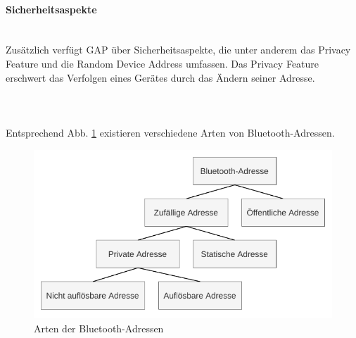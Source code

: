 \paragraph{Sicherheitsaspekte} \mbox{} \vspace{0.2cm} \\
\label{sec: gap sicherheit}
Zusätzlich verfügt GAP über Sicherheitsaspekte, die unter anderem das Privacy Feature und die Random Device Address umfassen. Das Privacy Feature erschwert das Verfolgen eines Gerätes durch das Ändern seiner Adresse.\\\\
\\\\
Entsprechend Abb. \ref{fig: bt adressen arten} existieren verschiedene Arten von Bluetooth-Adressen.

\begin{figure}[H]
    \centering
    \includegraphics{graphics/BT_Adressen_Baum.pdf}
    \caption{Arten der Bluetooth-Adressen}
    \label{fig: bt adressen arten}
\end{figure}


